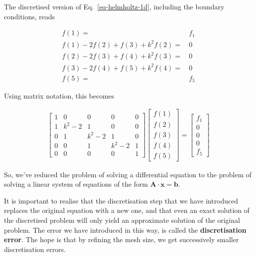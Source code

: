 The discretised version of Eq.~\ref{eq-helmholtz-1d}, including the boundary conditions, reads

\begin{align}
f(1)=& \, f_1 \\
f(1) -2f(2) + f(3) + k^2 f(2) =& \, 0 \\
f(2) -2f(3) + f(4) + k^2 f(3) =& \, 0\\
f(3) -2f(4) + f(5) + k^2 f(4) =& \, 0\\
f(5)=& \, f_5
\end{align} 

Using matrix notation, this becomes

\begin{gather}
\begin{bmatrix}
1& 0& 0& 0& 0 \\
1& k^2-2& 1& 0& 0 \\
0& 1& k^2-2& 1& 0  \\
0& 0& 1& k^2-2& 1  \\
0& 0& 0& 0& 1
\end{bmatrix}
\begin{bmatrix}
f(1) \\
f(2) \\
f(3) \\
f(4) \\
f(5)
\end{bmatrix}
= 
\begin{bmatrix}
f_1 \\
0 \\
0 \\
0 \\
f_5
\end{bmatrix} \label{eq-ex-fd}
\end{gather}

So, we've reduced the problem of solving a differential equation to the problem of solving a linear system of equations of the form ${\mathbf A}\cdot{\mathbf x}={\mathbf b}$.

It is important to realise that the discretisation step that we have introduced replaces the original equation with a new one, and that even an exact solution of the discretised problem will only yield an approximate solution of the original problem. The error we have introduced in this way, is called the \textbf{discretisation error}. The hope is that by refining the mesh size, we get successively smaller discretisation errors. 


\pagebreak




